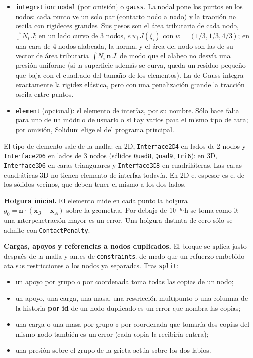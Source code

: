 \documentclass[11pt,oneside]{report}
\begin{document}
\begin{itemize}
  \item \texttt{integration}: \texttt{nodal} (por omisión) o \texttt{gauss}. La nodal pone los puntos en los nodos: cada punto ve un solo par (contacto nodo a nodo) y la tracción no oscila con rigideces grandes. Sus pesos son el área tributaria de cada nodo, $\int N_i\,J$; en un lado curvo de 3 nodos, $e\,w_i\,J(\xi_i)$ con $w = (1/3, 1/3, 4/3)$; en una cara de 4 nodos alabeada, la normal y el área del nodo son las de su vector de área tributaria $\int N_i\,\mathbf n\,J$, de modo que el alabeo no desvía una presión uniforme (si la superficie además se curva, queda un residuo pequeño que baja con el cuadrado del tamaño de los elementos). La de Gauss integra exactamente la rigidez elástica, pero con una penalización grande la tracción oscila entre puntos.
\end{itemize}

\begin{itemize}
  \item \texttt{element} (opcional): el elemento de interfaz, por su nombre. Sólo hace falta para uno de un módulo de usuario o si hay varios para el mismo tipo de cara; por omisión, Solidum elige el del programa principal.
\end{itemize}

El tipo de elemento sale de la malla: en 2D, \texttt{Interface2D4} en lados de 2 nodos y \texttt{Interface2D6} en lados de 3 nodos (sólidos \texttt{Quad8}, \texttt{Quad9}, \texttt{Tri6}); en 3D, \texttt{Interface3D6} en caras triangulares y \texttt{Interface3D8} en cuadriláteras. Las caras cuadráticas 3D no tienen elemento de interfaz todavía. En 2D el espesor es el de los sólidos vecinos, que deben tener el mismo a los dos lados.

\textbf{Holgura inicial.} El elemento mide en cada punto la holgura $g_0 = \mathbf n\cdot(\mathbf x_B - \mathbf x_A)$ sobre la geometría. Por debajo de 10\ensuremath{^{-}}⁶\ensuremath{\cdot}h se toma como 0; una interpenetración mayor es un error. Una holgura distinta de cero sólo se admite con \texttt{ContactPenalty}.

\textbf{Cargas, apoyos y referencias a nodos duplicados.} El bloque se aplica justo después de la malla y antes de \texttt{constraints}, de modo que un refuerzo embebido ata sus restricciones a los nodos ya separados. Tras \texttt{split}:

\begin{itemize}
  \item un apoyo por grupo o por coordenada toma todas las copias de un nodo;
  \item un apoyo, una carga, una masa, una restricción multipunto o una columna de la historia \textbf{por id} de un nodo duplicado es un error que nombra las copias;
  \item una carga o una masa por grupo o por coordenada que tomaría dos copias del mismo nodo también es un error (cada copia la recibiría entera);
  \item una presión sobre el grupo de la grieta actúa sobre los dos labios.
\end{itemize}
\end{document}
